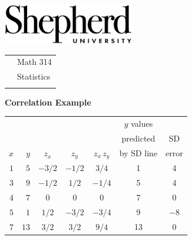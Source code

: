 \documentclass[10pt]{article}
\begin{document}
\pagestyle{empty}
\lstset{language=R, showspaces=false, showstringspaces=false}

\href{http://www.shepherd.edu}{\includegraphics[height=1.75cm]{logo-high-res.eps}}
\vspace{-1.69cm}

{\small
\begin{tabular}{cl}
& Math 314\\
& Statistics\\
\hspace{5.28in} &%
\end{tabular}
}
\setlength{\baselineskip}{1.05\baselineskip}

\begin{center}
\textbf{\large  Correlation Example}
\end{center}
\newcommand{\Z}{\hphantom{0}}
\newcommand{\VP}{\vphantom{\Large Y}}
\newcommand{\M}{\hphantom{$-$}}

\begin{center}
\begin{tabular}{|rr|ccc||cc|}\hline
    &     &       &       &           & $y$ values   & \VP\\
    &     &       &       &           &  predicted  & SD\\
$x$ & $y$ & $z_x$ & $z_y$ & $z_x\,z_y$ & by SD line  & error\\[2pt]\hline
$1$   & $5$   & $-3/2$\M  & $-1/2$\M  & $3/4$       &  1  & 4\VP\\
$3$   & $9$   & $-1/2$\M  & $1/2$   & $-1/4$\M      &  5  & 4\\
$4$   & $7$   & $0$     & $0$     & $0$         &  7  & 0\\
$5$   & $1$   & $1/2$   & $-3/2$\M  & $-3/4$\M      &  9  & $-8$\M\\
$7$   & $13$  & $3/2$   & $3/2$   & $9/4$       &  13 & 0\\ \hline
\end{tabular}
\end{center}
\end{document}
